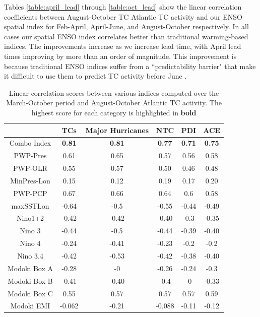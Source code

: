 \documentclass[]{article}
\begin{document}
Tables \ref{table:april_lead} through \ref{table:oct_lead} show the linear correlation coefficients between August-October TC Atlantic TC activity and our ENSO spatial index for Feb-April, April-June, and August-October respectively. In all cases our spatial ENSO index correlates better than traditional warming-based indices. The improvements increase as we increase lead time, with April lead times improving by more than an order of magnitude. This improvement is because traditional ENSO indices suffer from a ``predictability barrier" that make it difficult to use them to predict TC activity before June \cite{webster1992}.

\begin{table}
\begin{tabular}{cccccc}
\hline
&TCs & Major Hurricanes & NTC & PDI & ACE\\
\hline
Combo Index  & \textbf{0.81} & \textbf{0.81} & \textbf{0.77} & \textbf{0.71} & \textbf{0.75}\\
PWP-Pres & 0.61 & 0.65 & 0.57 & 0.56 & 0.58\\
PWP-OLR & 0.55 & 0.57 & 0.50 & 0.46 & 0.48\\
MinPres-Lon & 0.15 & 0.12 & 0.19 & 0.17 & 0.20\\
PWP-PCP  & 0.67 & 0.66 & 0.64 & 0.6 & 0.58\\
maxSSTLon & -0.64 & -0.5 & -0.55 & -0.44 & -0.49\\
Nino1+2 & -0.42 & -0.42 & -0.40 & -0.3 & -0.35\\
Nino 3 & -0.44 & -0.5 & -0.44 & -0.39 & -0.40\\
Nino 4 & -0.24 & -0.41 & -0.23 & -0.2 & -0.2\\
Nino 3.4 & -0.42 & -0.53 & -0.42 & -0.38 & -0.40\\
Modoki Box A & -0.28 & -0 & -0.26 & -0.24 & -0.3\\
Modoki Box B & -0.41 & -0.40 & -0.4 & -0 & -0.33\\
Modoki Box C & 0.55 & 0.57 & 0.57 & 0.57 & 0.59\\
Modoki EMI & -0.062 & -0.21 & -0.088 & -0.11 & -0.12\\
\hline
\end{tabular}
\caption{Linear correlation scores between various indices computed over the March-October period and August-October Atlantic TC activity. The highest score for each category is highlighted in \textbf{bold}}
\label{ref:lin_corr}
\end{table}
\end{document}
